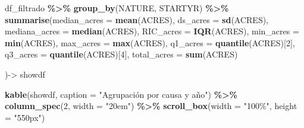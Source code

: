 \documentclass[
]{book}
\newenvironment{Shaded}{\begin{snugshade}}{\end{snugshade}}
\newcommand{\AttributeTok}[1]{\textcolor[rgb]{0.13,0.29,0.53}{#1}}
\newcommand{\DecValTok}[1]{\textcolor[rgb]{0.00,0.00,0.81}{#1}}
\newcommand{\FunctionTok}[1]{\textcolor[rgb]{0.13,0.29,0.53}{\textbf{#1}}}
\newcommand{\NormalTok}[1]{#1}
\newcommand{\OtherTok}[1]{\textcolor[rgb]{0.56,0.35,0.01}{#1}}
\newcommand{\SpecialCharTok}[1]{\textcolor[rgb]{0.81,0.36,0.00}{\textbf{#1}}}
\newcommand{\StringTok}[1]{\textcolor[rgb]{0.31,0.60,0.02}{#1}}
\begin{document}
\begin{Shaded}
\begin{Highlighting}[]
\NormalTok{df\_filtrado }\SpecialCharTok{\%\textgreater{}\%} 
  \FunctionTok{group\_by}\NormalTok{(NATURE, STARTYR) }\SpecialCharTok{\%\textgreater{}\%} 
  \FunctionTok{summarise}\NormalTok{(}\AttributeTok{median\_acres =} \FunctionTok{mean}\NormalTok{(ACRES),}
            \AttributeTok{ds\_acres =} \FunctionTok{sd}\NormalTok{(ACRES),}
            \AttributeTok{mediana\_acres =} \FunctionTok{median}\NormalTok{(ACRES),}
            \AttributeTok{RIC\_acres =} \FunctionTok{IQR}\NormalTok{(ACRES),}
            \AttributeTok{min\_acres =} \FunctionTok{min}\NormalTok{(ACRES),}
            \AttributeTok{max\_acres =} \FunctionTok{max}\NormalTok{(ACRES),}
            \AttributeTok{q1\_acres =} \FunctionTok{quantile}\NormalTok{(ACRES)[}\DecValTok{2}\NormalTok{],}
            \AttributeTok{q3\_acres =} \FunctionTok{quantile}\NormalTok{(ACRES)[}\DecValTok{4}\NormalTok{],}
            \AttributeTok{total\_acres =} \FunctionTok{sum}\NormalTok{(ACRES)}
            
\NormalTok{            )}\OtherTok{{-}\textgreater{}}\NormalTok{ showdf}

\FunctionTok{kable}\NormalTok{(showdf, }\AttributeTok{caption =} \StringTok{"Agrupación por causa y año"}\NormalTok{) }\SpecialCharTok{\%\textgreater{}\%} 
  \FunctionTok{column\_spec}\NormalTok{(}\DecValTok{2}\NormalTok{, }\AttributeTok{width =} \StringTok{"20em"}\NormalTok{) }\SpecialCharTok{\%\textgreater{}\%}
  \FunctionTok{scroll\_box}\NormalTok{(}\AttributeTok{width =} \StringTok{"100\%"}\NormalTok{, }\AttributeTok{height =} \StringTok{"550px"}\NormalTok{)}
\end{Highlighting}
\end{Shaded}
\end{document}

